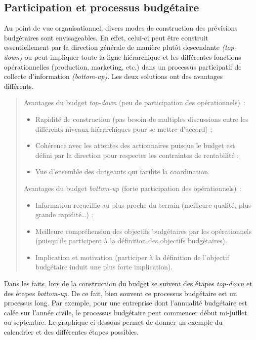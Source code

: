 \documentclass{tufte-handout}
\begin{document}
\subsection{Participation et processus budgétaire}
\label{sec:orge85fb45}
Au point de vue organisationnel, divers modes de construction des prévisions budgétaires sont envisageables. En effet, celui-ci peut être construit essentiellement par la direction générale de manière plutôt descendante \emph{(top-down)} ou peut impliquer toute la ligne hiérarchique et les différentes fonctions opérationnelles (production, marketing, etc.) dans un processus participatif de collecte d'information \emph{(bottom-up)}. Les deux solutions ont des avantages différents.\\
\begin{quote}
Avantages du budget \emph{top-down} (peu de participation des opérationnels) :\\
\begin{itemize}
\item Rapidité de construction (pas besoin de multiples discussions entre les différents niveaux hiérarchiques pour se mettre d'accord) ;\\
\item Cohérence avec les attentes des actionnaires puisque le budget est défini par la direction pour respecter les contraintes de rentabilité ;\\
\item Vue d'ensemble des dirigeants qui facilite la coordination.\\
\end{itemize}
Avantages du budget \emph{bottom-up} (forte participation des opérationnels) :\\
\begin{itemize}
\item Information recueillie au plus proche du terrain (meilleure qualité, plus grande rapidité\ldots{}) ;\\
\item Meilleure compréhension des objectifs budgétaires par les opérationnels (puisqu'ils participent à la définition des objectifs budgétaires).\\
\item Implication et motivation (participer à la définition de l'objectif budgétaire induit une plus forte implication).\\
\end{itemize}
\end{quote}
Dans les faits, lors de la construction du budget se suivent des étapes \emph{top-down} et des étapes \emph{bottom-up}. De ce fait, bien souvent ce processus budgétaire est un processus long. Par exemple, pour une entreprise dont l'annualité budgétaire est calée sur l'année civile, le processus budgétaire peut commencer début mi-juillet ou septembre. Le graphique ci-dessous permet de donner un exemple du calendrier et des différentes étapes possibles.\\
\end{document}
